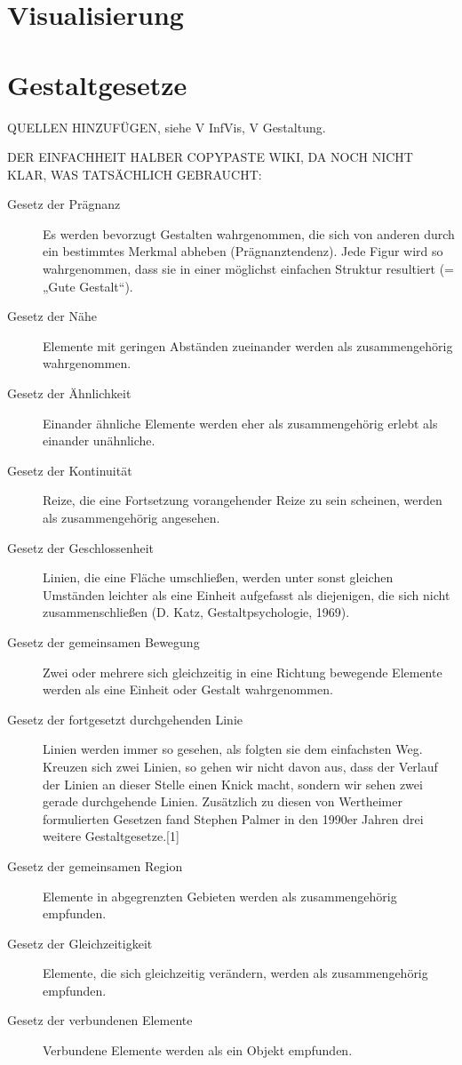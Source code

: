 \section{Visualisierung}


\section{Gestaltgesetze}\label{sec:gestaltgesetze}
QUELLEN HINZUFÜGEN,  siehe V InfVis, V Gestaltung.

DER EINFACHHEIT HALBER COPYPASTE WIKI, DA NOCH NICHT KLAR, WAS TATSÄCHLICH GEBRAUCHT:
\begin{description}
\item [Gesetz der Prägnanz]
Es werden bevorzugt Gestalten wahrgenommen, die sich von anderen durch ein bestimmtes Merkmal abheben (Prägnanztendenz). Jede Figur wird so wahrgenommen, dass sie in einer möglichst einfachen Struktur resultiert (= „Gute Gestalt“).
\item [Gesetz der Nähe]
Elemente mit geringen Abständen zueinander werden als zusammengehörig wahrgenommen.
\item [Gesetz der Ähnlichkeit]
Einander ähnliche Elemente werden eher als zusammengehörig erlebt als einander unähnliche.
\item [Gesetz der Kontinuität]
Reize, die eine Fortsetzung vorangehender Reize zu sein scheinen, werden als zusammengehörig angesehen.
\item [Gesetz der Geschlossenheit]
Linien, die eine Fläche umschließen, werden unter sonst gleichen Umständen leichter als eine Einheit aufgefasst als diejenigen, die sich nicht zusammenschließen (D. Katz, Gestaltpsychologie, 1969).
\item [Gesetz der gemeinsamen Bewegung]
Zwei oder mehrere sich gleichzeitig in eine Richtung bewegende Elemente werden als eine Einheit oder Gestalt wahrgenommen.
\item [Gesetz der fortgesetzt durchgehenden Linie]
Linien werden immer so gesehen, als folgten sie dem einfachsten Weg. Kreuzen sich zwei Linien, so gehen wir nicht davon aus, dass der Verlauf der Linien an dieser Stelle einen Knick macht, sondern wir sehen zwei gerade durchgehende Linien.
Zusätzlich zu diesen von Wertheimer formulierten Gesetzen fand Stephen Palmer in den 1990er Jahren drei weitere Gestaltgesetze.[1]

\item [Gesetz der gemeinsamen Region]
Elemente in abgegrenzten Gebieten werden als zusammengehörig empfunden.
\item [Gesetz der Gleichzeitigkeit]
Elemente, die sich gleichzeitig verändern, werden als zusammengehörig empfunden.
\item [Gesetz der verbundenen Elemente]
Verbundene Elemente werden als ein Objekt empfunden.
\end{description}

